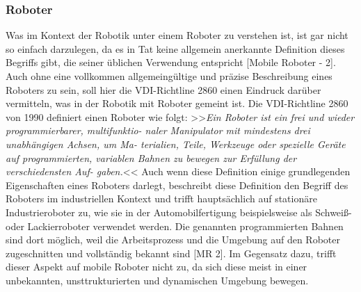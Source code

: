 \subsubsection{Roboter}
\color{finishing}
Was im Kontext der Robotik unter einem Roboter zu verstehen ist, ist gar nicht so einfach darzulegen, da es in Tat keine allgemein anerkannte Definition dieses Begriffs gibt, die seiner üblichen Verwendung entspricht [Mobile Roboter - 2].
\newline
Auch ohne eine vollkommen allgemeingültige und präzise Beschreibung eines Roboters zu sein, soll hier die VDI-Richtline 2860 einen Eindruck darüber vermitteln, was in der Robotik mit Roboter gemeint ist. \newline
Die VDI-Richtline 2860 von 1990 definiert einen Roboter wie folgt:
\vspace{2mm}
\newline
>>\textit{Ein Roboter ist ein frei und wieder programmierbarer, multifunktio-
naler Manipulator mit mindestens drei unabhängigen Achsen, um Ma-
terialien, Teile, Werkzeuge oder spezielle Geräte auf programmierten,
variablen Bahnen zu bewegen zur Erfüllung der verschiedensten Auf-
gaben.}<<
\vspace{2mm}
\newline
Auch wenn diese Definition einige grundlegenden Eigenschaften eines Roboters darlegt, beschreibt diese Definition den Begriff des Roboters im industriellen Kontext und trifft hauptsächlich auf stationäre Industrieroboter zu, wie sie in der Automobilfertigung beispielsweise als Schweiß- oder Lackierroboter verwendet werden. Die genannten programmierten Bahnen sind dort möglich, weil die Arbeitsprozess und die Umgebung auf den Roboter zugeschnitten und vollständig bekannt sind [MR 2]. \newline
Im Gegensatz dazu, trifft dieser Aspekt auf mobile Roboter nicht zu, da sich diese meist in einer unbekannten, unsttrukturierten und dynamischen Umgebung bewegen.
